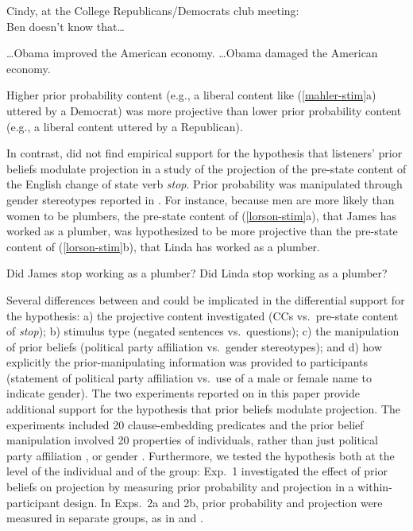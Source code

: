 \documentclass[OpenMind]{stjour}
\begin{document}
\begin{exe}
\ex\label{mahler-stim} Cindy, at the College Republicans/Democrats club meeting: \\ Ben doesn't know that\ldots
\begin{xlist}
\ex \ldots Obama improved the American economy.
\ex \ldots Obama damaged the American economy. \hfill \cite[784f.]{mahler2020}
\end{xlist}
\end{exe}
Higher prior probability content (e.g., a liberal content like (\ref{mahler-stim}a) uttered by a Democrat) was more projective than lower prior probability content (e.g., a liberal content uttered by a Republican). 

In contrast, \citet{lorson2018} did not find empirical support for the hypothesis that listeners' prior beliefs modulate projection %
in a study of the projection of the pre-state content of the English change of state verb {\em stop}. Prior probability was manipulated through gender stereotypes reported in \citet{boyce-etal2018}. For instance, because men are more likely than women to be plumbers, the pre-state content of (\ref{lorson-stim}a), that James has worked as a plumber, was hypothesized to be more projective than the pre-state content of (\ref{lorson-stim}b), that Linda has worked as a plumber.

\begin{exe}
\ex\label{lorson-stim} 
\begin{xlist}
\ex Did James stop working as a plumber?
\ex Did Linda stop working as a plumber? \hfill \cite[38]{lorson2018}
\end{xlist}
\end{exe}

Several differences between \citet{mahler2020} and \citet{lorson2018}  could be implicated in the differential support for the hypothesis: a) the projective content investigated (CCs vs.\ pre-state content of {\em stop}); b) stimulus type (negated sentences vs.\ questions); c) the manipulation of prior beliefs (political party affiliation vs.\ gender stereotypes); and d) how explicitly the prior-manipulating information was provided to participants (statement of political party affiliation vs.\  use of a male or female name to indicate gender). The two experiments reported on in this paper provide additional support for the hypothesis that prior beliefs modulate projection. The experiments included 20 clause-embedding predicates \citep[rather than just 7, as in][]{mahler2020} and the prior belief manipulation involved 20 properties of individuals, rather than just political party affiliation \citep[as in][]{mahler2020}, or gender \citep[as in][]{lorson2018}. Furthermore, we tested the hypothesis both at the level of the individual and of the group: Exp.~1 investigated the effect of prior beliefs on projection by measuring prior probability and projection in a within-participant design. In Exps.~2a and 2b, prior probability and projection were measured in separate groups, as in \citet{mahler2020} and \citet{lorson2018}. 
\end{document}
